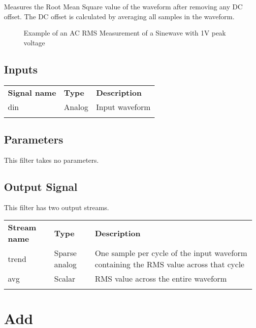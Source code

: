 Measures the Root Mean Square value of the waveform after removing any DC offset. The DC offset is calculated by
averaging all samples in the waveform.

\begin{figure}[h]
\centering
{}
\caption{Example of an AC RMS Measurement of a Sinewave with 1V peak voltage}
\end{figure}

\subsection{Inputs}

\begin{tabularx}{16cm}{llX}
\thickhline
\textbf{Signal name} & \textbf{Type} & \textbf{Description} \\
\thickhline
din & Analog & Input waveform \\
\thickhline
\end{tabularx}

\subsection{Parameters}

This filter takes no parameters.

\subsection{Output Signal}

This filter has two output streams.

\begin{tabularx}{16cm}{llX}
\thickhline
\textbf{Stream name} & \textbf{Type} & \textbf{Description} \\
\thickhline
trend & Sparse analog & One sample per cycle of the input waveform containing the RMS value across that cycle \\
\thinhline
avg & Scalar & RMS value across the entire waveform \\
\thickhline
\end{tabularx}

\pagebreak
\section{Add}
\label{filter:add}

